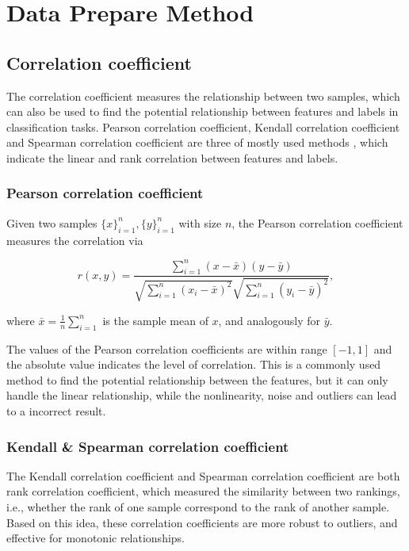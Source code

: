 \documentclass[11pt]{article}
\begin{document}
\section{Data Prepare Method}

\subsection{Correlation coefficient}

The correlation coefficient measures the relationship between two samples, which can also be used to find the potential relationship between features and labels in classification tasks. Pearson correlation coefficient, Kendall correlation coefficient and Spearman correlation coefficient are three of mostly used methods \cite{abdi2007kendall} \cite{hauke2011comparison}, which indicate the linear and rank correlation between features and labels.

\subsubsection{Pearson correlation coefficient}

Given two samples $\{x\}_{i=1}^n, \{y\}_{i=1}^n$ with size $n$, the Pearson correlation coefficient measures the correlation via

$$
  r (x, y) = \frac{\sum_{i=1}^n (x - \bar{x}) (y - \bar{y})}{\sqrt{\sum_{i=1}^n (x_i - \bar{x})^2} \sqrt{\sum_{i=1}^n (y_i - \bar{y})^2}},
$$

\noindent where $\bar{x} = \frac{1}{n} \sum_{i=1}^n$ is the sample mean of $x$, and analogously for $\bar{y}$.

The values of the Pearson correlation coefficients are within range $[-1, 1]$ and the absolute value indicates the level of correlation. This is a commonly used method to find the potential relationship between the features, but it can only handle the linear relationship, while the nonlinearity, noise and outliers can lead to a incorrect result.

\subsubsection{Kendall \& Spearman correlation coefficient}

The Kendall correlation coefficient and Spearman correlation coefficient are both rank correlation coefficient, which measured the similarity between two rankings, i.e., whether the rank of one sample correspond to the rank of another sample. Based on this idea, these correlation coefficients are more robust to outliers, and effective for monotonic relationships.
\end{document}
